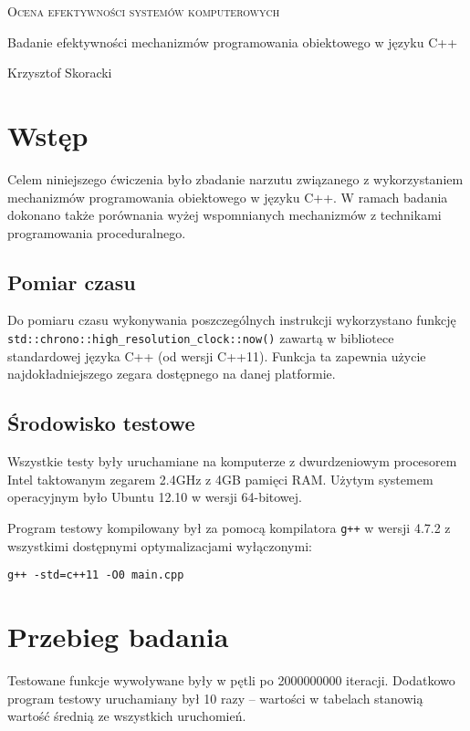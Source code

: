 \documentclass{article}
\begin{document}
\renewcommand*{\tablename}{Tab.}
\begin{center}
\textsc{\huge Ocena efektywności systemów komputerowych}


\vspace{0.8cm}
{\Large Badanie efektywności mechanizmów programowania obiektowego w języku C++}
\vspace{0.8cm}

Krzysztof Skoracki
\vspace{1cm}
\end{center}
\section{Wstęp}
Celem niniejszego ćwiczenia było zbadanie narzutu związanego z wykorzystaniem mechanizmów programowania obiektowego w języku C++. W ramach badania dokonano także porównania wyżej wspomnianych mechanizmów z technikami programowania proceduralnego.

\subsection{Pomiar czasu}
Do pomiaru czasu wykonywania poszczególnych instrukcji wykorzystano funkcję \texttt{std::chrono::high\_resolution\_clock::now()} zawartą w bibliotece standardowej języka C++ (od wersji C++11). Funkcja ta zapewnia użycie najdokładniejszego zegara dostępnego na danej platformie.

\subsection{Środowisko testowe}
Wszystkie testy były uruchamiane na komputerze z dwurdzeniowym procesorem Intel taktowanym zegarem 2.4GHz z 4GB pamięci RAM. Użytym systemem operacyjnym było Ubuntu 12.10 w wersji 64-bitowej.

Program testowy kompilowany był za pomocą kompilatora \texttt{g++} w wersji 4.7.2 z wszystkimi dostępnymi optymalizacjami wyłączonymi:

\texttt{g++ -std=c++11 -O0 main.cpp}

\section{Przebieg badania}
Testowane funkcje wywoływane były w pętli po 2000000000 iteracji. Dodatkowo program testowy uruchamiany był 10 razy -- wartości w tabelach stanowią wartość średnią ze wszystkich uruchomień.
\end{document}
